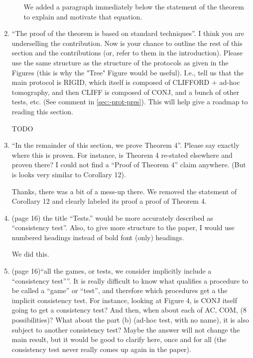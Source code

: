 \documentclass[12pt]{article}
\begin{document}
\begin{enumerate}
\begin{enumerate}
{\color{blue} We added a paragraph immediately below the statement of the theorem to explain and motivate that equation.}

\end{enumerate}
\item ``The proof of the theorem is based on standard techniques''. I think you are underselling the contribution. Now is your chance to outline the rest of this section and the contributions (or, refer to them in the introduction). Please use the same structure as the structure of the protocols as given in the Figures (this is why the "Tree" Figure would be useful). I.e., tell us that the main protocol is RIGID, which itself is composed of CLIFFORD + ad-hoc tomography, and then CLIFF is composed of CONJ, and a bunch of other tests, etc. (See comment in \ref{sec:-prot-pres}). This will help give a roadmap to reading this section.

{\color{red} TODO}

\item ``In the remainder of this section, we prove Theorem 4''. Please say exactly where this is proven. For instance, is Theorem 4 re-stated elsewhere and proven there? I could not find a ``Proof of Theorem 4'' claim anywhere. (But is looks very similar to Corollary 12).

{\color{blue} Thanks, there was a bit of a mess-up there. We removed the statement of Corollary 12 and clearly labeled its proof a proof of Theorem 4.}

    \item (page 16) the title ``Tests.'' would be more accurately described as ``consistency test''. Also, to give more structure to the paper, I would use numbered headings instead of bold font (only) headings.
		
{\color{blue} We did this.}
		
        \item (page 16)``all the games, or tests, we
consider implicitly include a “consistency test”''. It is really difficult to know what qualifies a procedure to be called a ``game'' or ``test'', and therefore which procedures get a the implicit consistency test. For instance, looking at Figure 4, is CONJ itself going to get a consistency test? And then, when about each of AC, COM, (8 possibilities)? What about the part (b) (ad-hoc test, with no name), it is also subject to another consistency test? Maybe the answer will not change the main result, but it would be good to clarify here, once and for all (the consistency test never really comes up again in the paper).


\end{enumerate}
\end{document}
